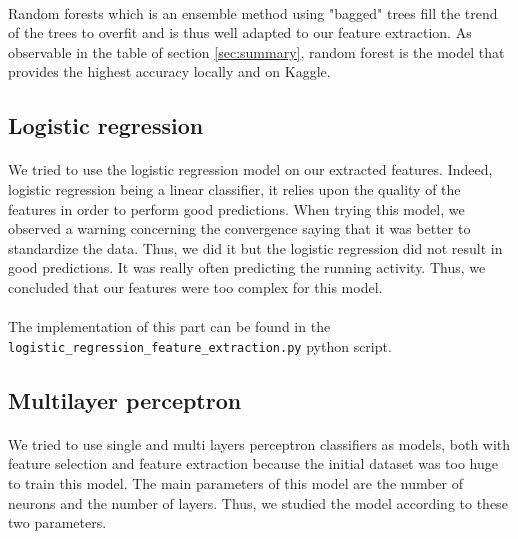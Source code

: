 \documentclass[a4paper, 11pt, oneside]{article}
\begin{document}
\paragraph{}Random forests which is an ensemble method using "bagged" trees fill the trend of the trees to overfit and is thus well adapted to our feature extraction. As observable in the table of section \ref{sec:summary}, random forest is the model that provides the highest accuracy locally and on Kaggle. 


\subsection{Logistic regression} \label{subsec:lr}

\paragraph{}We tried to use the logistic regression model on our extracted features. Indeed, logistic regression being a linear classifier, it relies upon the quality of the features in order to perform good predictions.
When trying this model, we observed a warning concerning the convergence saying that it was better to standardize the data. Thus, we did it but the logistic regression did not result in good predictions. It was really often predicting the running activity. 
Thus, we concluded that our features were too complex for this model. 

\paragraph{}The implementation of this part can be found in the \texttt{logistic\_regression\_feature\_extraction.py} python script.


\subsection{Multilayer perceptron} \label{subsec:mlp}
\paragraph{}We tried to use single and multi layers perceptron classifiers as models, both with feature selection and feature extraction because the initial dataset was too huge to train this model. The main parameters of this model
are the number of neurons and the number of layers. Thus, we studied the model according to these two parameters.
\end{document}
